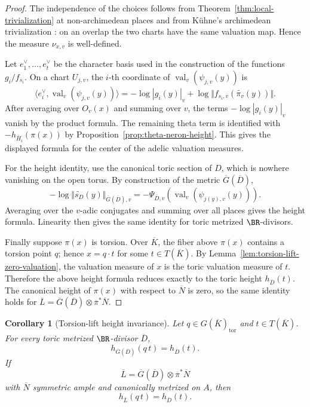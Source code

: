 \documentclass[10pt,a4paper]{amsart}
\theoremstyle{plain}
\newtheorem{corollary}[theorem]{Corollary}
\DeclareMathOperator{\val}{val}
\theoremstyle{plain}
\numberwithin{equation}{section}
\providecommand{\bD}{\overline{D}}
\providecommand{\bL}{\overline{L}}
\providecommand{\bN}{\overline{N}}
\begin{document}
\begin{proof}
	The independence of the choices follows from
	Theorem~\ref{thm:local-trivialization} at non-archimedean places and from
	K\"uhne's archimedean trivialization \cite[Lemma 11]{Ku1}: on an overlap the two
	charts have the same valuation map.  Hence the measure \(\nu_{x,v}\) is
	well-defined.
	
	Let \(e_1^\vee,\ldots,e_t^\vee\) be the character basis used in the construction
	of the functions \(g_i/f_{s_i}\).  On a chart \(U_{j,v}\), the \(i\)-th
	coordinate of \(\val_v(\psi_{j,v}(y))\) is
	\[
	\langle e_i^\vee,\val_v(\psi_{j,v}(y))\rangle
	=
	-\log |g_i(y)|_v
	+\log\Vert f_{s_i,v}(\widetilde{\pi_v}(y))\Vert .
	\]
	After averaging over \(O_v(x)\) and summing over \(v\), the terms
	\(-\log |g_i(y)|_v\) vanish by the product formula.  The remaining theta term is
	identified with \(-h_{\overline H_i}(\pi(x))\) by
	Proposition~\ref{prop:theta-neron-height}.  This gives the displayed formula
	for the center of the adelic valuation measures.
	
	For the height identity, use the canonical toric section of \(D\), which is
	nowhere vanishing on the open torus.  By construction of the metric
	\(\overline G(\bD)\),
	\[
	-\log\Vert\widetilde{s_D}(y)\Vert_{\overline G(\bD),v}
	=
	-\Psi_{\bD,v}(\val_v(\psi_{j(y),v}(y))).
	\]
	Averaging over the \(v\)-adic conjugates and summing over all places gives the
	height formula.  Linearity then gives the same identity for toric metrized
	\(\BR\)-divisors.
	
	Finally suppose \(\pi(x)\) is torsion.  Over \(\overline K\), the fiber above
	\(\pi(x)\) contains a torsion point \(q\); hence \(x=q\cdot t\) for some
	\(t\in T(\overline K)\).  By
	Lemma~\ref{lem:torsion-lift-zero-valuation}, the valuation measure of \(x\) is
	the toric valuation measure of \(t\).  Therefore the above height formula
	reduces exactly to the toric height \(h_{\bD}(t)\).  The canonical height of
	\(\pi(x)\) with respect to \(\bN\) is zero, so the same identity holds for
	\(\bL=\overline G(\bD)\otimes\overline\pi^*\bN\).
\end{proof}

\begin{corollary}[Torsion-lift height invariance]
	\label{cor:torsion-lift-height-invariance}
	Let \(q\in G(\overline K)_{\operatorname{tor}}\) and \(t\in T(\overline K)\).
	For every toric metrized \(\BR\)-divisor \(\bD\),
	\[
	h_{\overline G(\bD)}(q\,t)=h_{\bD}(t).
	\]
	If
	\[
	\bL=\overline G(\bD)\otimes\overline\pi^*\bN
	\]
	with \(\bN\) symmetric ample and canonically metrized on \(A\), then
	\[
	h_{\bL}(q\,t)=h_{\bD}(t).
	\]
\end{corollary}
\end{document}
